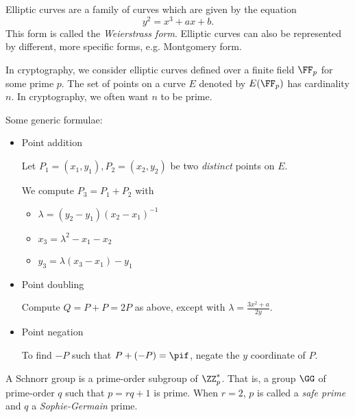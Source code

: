 \documentclass{practice}
\begin{document}
\begin{tcolorbox}[title=Elliptic curves]
  Elliptic curves are a family of curves which are given by the equation
  \[
    y^2 = x^3 + ax + b.
  \]
  This form is called the \emph{Weierstrass form}.
  Elliptic curves can also be represented by different, more specific forms, e.g. Montgomery form.

  In cryptography, we consider elliptic curves defined over a finite field $\FF_p$ for some prime $p$.
  The set of points on a curve $E$ denoted by $E(\FF_p)$ has cardinality $n$.
  In cryptography, we often want $n$ to be prime.

  \tcblower

  Some generic formulae:
  \begin{itemize}
    \item Point addition
    
    Let $P_1 = (x_1, y_1), P_2 = (x_2, y_2)$ be two \emph{distinct} points on $E$.

    We compute $P_3 = P_1 + P_2$ with
    \begin{itemize}
      \item $\lambda = (y_2 - y_1)(x_2 - x_1)^{-1}$
      \item $x_3 = \lambda^2 - x_1 - x_2$
      \item $y_3 = \lambda(x_3 - x_1) - y_1$
    \end{itemize}

    \item Point doubling
    
    Compute $Q = P + P = 2P$ as above, except with 
    $\lambda = \frac{3x^2 + a}{2y}$.

    \item Point negation
    
    To find $-P$ such that $P + (-P) = \pif$, negate the $y$ coordinate of $P$.
  \end{itemize}
\end{tcolorbox}

\newpage

\begin{tcolorbox}[title=Schnorr group]
  A Schnorr group is a prime-order subgroup of $\ZZ_p^*$.
  That is, a group $\GG$ of prime-order $q$ such that $p=rq + 1$ is prime.
  When $r = 2$, $p$ is called a \emph{safe prime} and $q$ a \emph{Sophie-Germain} prime.
\end{tcolorbox}
\end{document}
